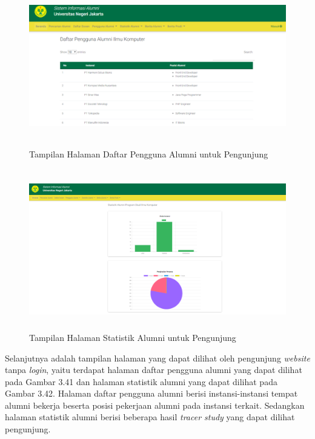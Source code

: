 \begin{figure}[H]
	\centering
	\includegraphics[width=14cm,height=7cm]{gambar/tampilan/pengunjung_daftarPengguna}
	\caption{Tampilan Halaman Daftar Pengguna Alumni untuk Pengunjung}
	\label{ui_pengunjungDaftarPengguna}
\end{figure}

\begin{figure}[H]
	\centering
	\includegraphics[width=14cm,height=7cm]{gambar/tampilan/pengunjung_statistik}
	\caption{Tampilan Halaman Statistik Alumni untuk Pengunjung}
	\label{ui_pengunjungStatistik}
\end{figure}

Selanjutnya adalah tampilan halaman yang dapat dilihat oleh pengunjung \textit{website} tanpa \textit{login}, yaitu terdapat halaman daftar pengguna alumni yang dapat dilihat pada Gambar 3.41 dan halaman statistik alumni yang dapat dilihat pada Gambar 3.42. Halaman daftar pengguna alumni berisi instansi-instansi tempat alumni bekerja beserta posisi pekerjaan alumni pada instansi terkait. Sedangkan halaman statistik alumni berisi beberapa hasil \textit{tracer study} yang dapat dilihat pengunjung.

